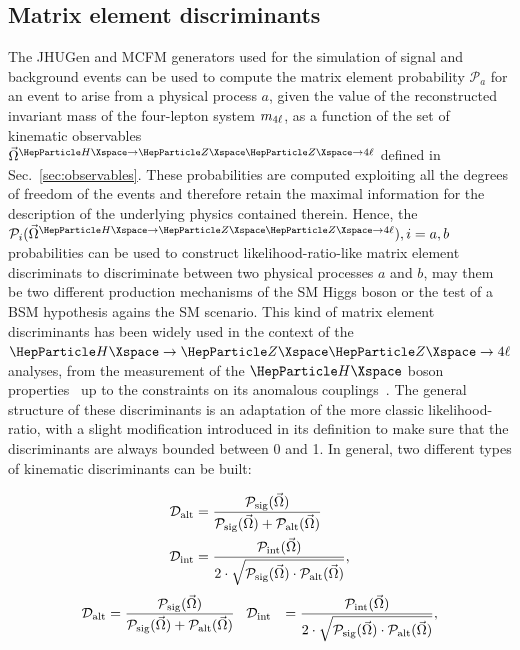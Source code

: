\subsection{Matrix element discriminants}
\label{sec:discriminants}
The JHUGen and MCFM generators used for the simulation of signal and background events can be used to compute the matrix element probability $\mathcal{P}_a$ for  an event to arise from a physical process $a$, given the value of the reconstructed invariant mass of the four-lepton system $m_{4\ell}$, as a function of the set of kinematic observables $\vec\Omega^{\HZZfl}$ defined in Sec.~\ref{sec:observables}.
These probabilities are computed exploiting all the degrees of freedom of the events and therefore retain the maximal information for the description of the underlying physics contained therein.
Hence, the $\mathcal{P}_i(\vec\Omega^{\HZZfl}), i=a,b$ probabilities can be used to construct likelihood-ratio-like matrix element discriminats to discriminate between two physical processes $a$ and $b$, may them be two different production mechanisms of the SM Higgs boson or the test of a BSM hypothesis agains the SM scenario.
This kind of matrix element discriminants has been widely used in the context of the $\HZZfl$ analyses, from the measurement of the $\PH$ boson properties~\cite{CMSHIG19001} up to the constraints on its anomalous couplings~\cite{CMSHIG19009}.
The general structure of these discriminants is an adaptation of the more classic likelihood-ratio, with a slight modification introduced in its definition to make sure that the discriminants are always bounded between 0 and 1.
In general, two different types of kinematic discriminants can be built:
\begin{linenomath}
	{
		\begin{equation}
		\label{eqn:mela}
		\begin{aligned}
		\Dalt &=
		\frac{ \mathcal{P}_{\text{sig}} (\vec\Omega) }
		{\mathcal{P}_{\text{sig}} (\vec\Omega) + \mathcal{P}_{\text{alt}} (\vec\Omega) } \\
		\Dint &=
		\frac{ \mathcal{P}_{\text{int}} (\vec\Omega) }
		{2\cdot\sqrt{\mathcal{P}_{\text{sig}} (\vec\Omega) \cdot \mathcal{P}_{\text{alt}} (\vec\Omega)} },
		\end{aligned}
		\end{equation}
	}
	{
		\begin{equation}
		\label{eqn:mela}
		\begin{aligned}
		{\mathcal D}_{\text{alt}} &=
		\frac{ \mathcal{P}_{\text{sig}} (\vec\Omega) }
		{\mathcal{P}_{\text{sig}} (\vec\Omega) + \mathcal{P}_{\text{alt}} (\vec\Omega) }
		\,\,\,\,\,
		{\mathcal D}_{\text{int}} &=
		\frac{ \mathcal{P}_{\text{int}} (\vec\Omega) }
		{2\cdot\sqrt{\mathcal{P}_{\text{sig}} (\vec\Omega) \cdot \mathcal{P}_{\text{alt}} (\vec\Omega)} },
		\end{aligned}
		\end{equation}
	}
\end{linenomath}


